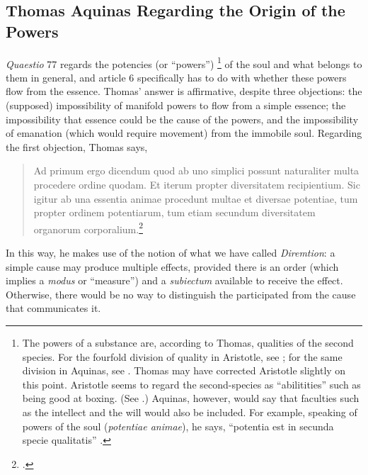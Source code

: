 \subsection{Thomas Aquinas Regarding the Origin of the Powers}
\label{sec:origin-of-powers}

\emph{Quaestio} 77 regards the potencies (or ``powers'')%
%
\footnote{The powers of a substance are, according to Thomas, qualities of the second species. For the fourfold division of quality in Aristotle, see \cite[8b25-10a14]{aristotle:categories}; for the same division in Aquinas, see \cite[I-II, q.~49, a.~2, co.]{st:summa}. Thomas may have corrected Aristotle slightly on this point. Aristotle seems to regard the second-species as ``abilitities'' such as being good at boxing. (See \cite[9a14-17]{aristotle:categories}.) Aquinas, however, would say that faculties such as the intellect and the will would also be included. For example, speaking of powers of the soul (\emph{potentiae animae}), he says, ``potentia est in secunda specie qualitatis''  \parencite[I-II, q.~56. a.~1, arg.~3]{st:summa}.} of the soul and what belongs to them in general, and article 6 specifically has to do with whether these powers flow from the essence. Thomas' answer is affirmative, despite three objections: the (supposed) impossibility of manifold powers to flow from a simple essence; the impossibility that essence could be the cause of the powers, and the impossibility of emanation (which would require movement) from the immobile soul. Regarding the first objection, Thomas says,
%
\begin{quotation}
Ad primum ergo dicendum quod ab uno simplici possunt naturaliter multa procedere ordine quodam. Et iterum propter diversitatem recipientium. Sic igitur ab una essentia animae procedunt multae et diversae potentiae, tum propter ordinem potentiarum, tum etiam secundum diversitatem organorum corporalium.\footcite[I, q.~77, a.~6, ad 1]{st:summa}
\end{quotation}
%
In this way, he makes use of the notion of what we have called \emph{Diremtion}: a simple cause may produce multiple effects, provided there is an order (which implies a \emph{modus} or ``measure'') and a \emph{subiectum} available to receive the effect. Otherwise, there would be no way to distinguish the participated from the cause that communicates it.

